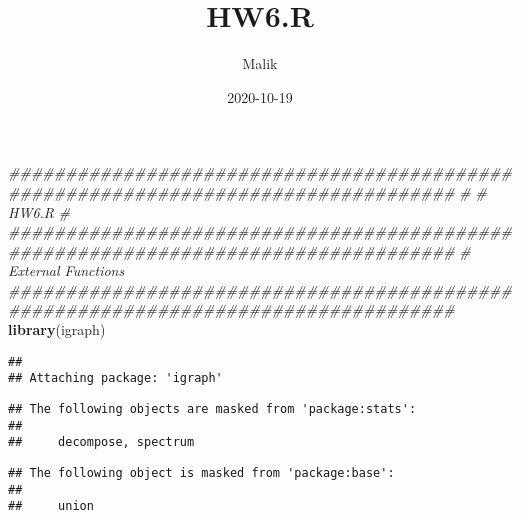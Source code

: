 \documentclass[
]{article}
\title{HW6.R}
\author{Malik}
\date{2020-10-19}
\newenvironment{Shaded}{\begin{snugshade}}{\end{snugshade}}
\newcommand{\CommentTok}[1]{\textcolor[rgb]{0.56,0.35,0.01}{\textit{#1}}}
\newcommand{\KeywordTok}[1]{\textcolor[rgb]{0.13,0.29,0.53}{\textbf{#1}}}
\newcommand{\NormalTok}[1]{#1}
\begin{document}
\maketitle

\begin{Shaded}
\begin{Highlighting}[]
\CommentTok{###################################################################################}
\CommentTok{#}
\CommentTok{# HW6.R}
\CommentTok{#}
\CommentTok{###################################################################################}
\CommentTok{# External Functions}
\CommentTok{###################################################################################}
\KeywordTok{library}\NormalTok{(igraph)}
\end{Highlighting}
\end{Shaded}

\begin{verbatim}
## 
## Attaching package: 'igraph'
\end{verbatim}

\begin{verbatim}
## The following objects are masked from 'package:stats':
## 
##     decompose, spectrum
\end{verbatim}

\begin{verbatim}
## The following object is masked from 'package:base':
## 
##     union
\end{verbatim}
\end{document}
